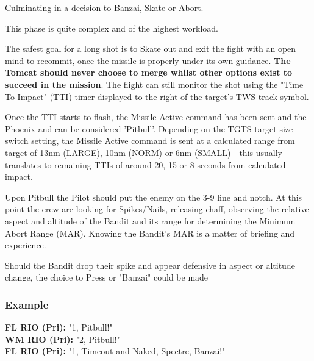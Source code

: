 Culminating in a decision to Banzai, Skate or Abort.

This phase is quite complex and of the highest workload.


The safest goal for a long shot is to Skate out and exit the fight with an open
mind to recommit, once the missile is properly under its own guidance.
\textbf{The Tomcat should never choose to merge whilst other options
exist to succeed in the mission}. The flight can still monitor the shot using
the "Time To Impact" (TTI) timer displayed to the right of the target's TWS
track symbol.

Once the TTI starts to flash, the Missile Active command has been sent and the
Phoenix and can be considered 'Pitbull'. Depending on the TGTS target size
switch setting, the Missile Active command is sent at a calculated range from
target of 13nm (LARGE), 10nm (NORM) or 6nm (SMALL) - this usually translates to
remaining TTIs of around 20, 15 or 8 seconds from calculated impact.

Upon Pitbull the Pilot should put the enemy on the 3-9 line and notch. At this
point the crew are looking for Spikes/Nails, releasing chaff, observing the
relative aspect and altitude of the Bandit and its range for determining the
Minimum Abort Range (MAR). Knowing the Bandit's MAR is a matter of briefing and
experience.

Should the Bandit drop their spike and appear defensive in aspect or altitude
change, the choice to Press or "Banzai" could be made


\subsubsection*{Example}


\textbf{FL RIO (Pri):} "1, Pitbull!"\\
\textbf{WM RIO (Pri):} "2, Pitbull!"\\
\textbf{FL RIO (Pri):} "1, Timeout and Naked, Spectre, Banzai!"\\

